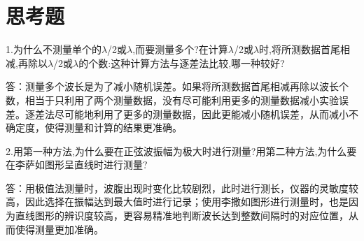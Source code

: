\documentclass[a4paper, 10pt]{article}
\begin{document}
\section{思考题}
\noindent 1.为什么不测量单个的$\lambda$/2或$\lambda$,而要测量多个?在计算$\lambda$/2或$\lambda$时,将所测数据首尾相减,再除以$\lambda$/2或$\lambda$的个数:这种计算方法与逐差法比较,哪一种较好?

\vspace{10pt}
\noindent 答：测量多个波长是为了减小随机误差。如果将所测数据首尾相减再除以波长个数，相当于只利用了两个测量数据，没有尽可能利用更多的测量数据减小实验误差。逐差法尽可能地利用了更多的测量数据，因此更能减小随机误差，从而减小不确定度，使得测量和计算的结果更准确。

\vspace{10pt}
\noindent 2.用第一种方法,为什么要在正弦波振幅为极大时进行测量?用第二种方法,为什么要在李萨如图形呈直线时进行测量?

\vspace{10pt}
\noindent 答：用极值法测量时，波腹出现时变化比较剧烈，此时进行测长，仪器的灵敏度较高，因此选择在振幅达到最大值时进行记录；使用李撒如图形进行测量时，也是因为直线图形的辨识度较高，更容易精准地判断波长达到整数间隔时的对应位置，从而使得测量更加准确。
\end{document}
